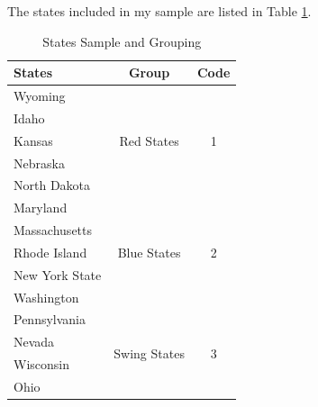 \documentclass[man]{apa7}
\begin{document}
The states included in my sample are listed in Table \ref{Table 2.3}.

\begin{table}
  \caption{States Sample and Grouping}
  \begin{tabular}{p{7.57em}cc}
    \toprule
    States         & \multicolumn{1}{p{7.93em}}{Group}                    & \multicolumn{1}{p{6.855em}}{Code} \\
    \midrule
    Wyoming        & \multicolumn{1}{c}{\multirow{5}[2]{*}{Red States}}   & \multirow{5}[2]{*}{1}             \\
    Idaho          &                                                      &                                   \\
    Kansas         &                                                      &                                   \\
    Nebraska       &                                                      &                                   \\
    North Dakota   &                                                      &                                   \\
    \midrule
    Maryland       & \multicolumn{1}{c}{\multirow{5}[2]{*}{Blue States}}  & \multirow{5}[2]{*}{2}             \\
    Massachusetts  &                                                      &                                   \\
    Rhode Island   &                                                      &                                   \\
    New York State &                                                      &                                   \\
    Washington     &                                                      &                                   \\
    \midrule
    Pennsylvania   & \multicolumn{1}{c}{\multirow{4}[2]{*}{Swing States}} & \multirow{4}[2]{*}{3}             \\
    Nevada         &                                                      &                                   \\
    Wisconsin      &                                                      &                                   \\
    Ohio           &                                                      &                                   \\
    \bottomrule
  \end{tabular}%
  \label{Table 2.3}%
\end{table}%
\end{document}
